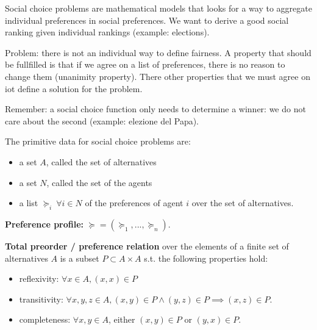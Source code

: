 
%



\bigskip
\noindent Social choice problems are mathematical models that looks for a way to aggregate 
individual preferences in social preferences. We want to derive a good social 
ranking given individual rankings (example: elections).

\noindent Problem: there is not an individual way to define fairness. A property 
that should be fullfilled is that if we agree on a list of preferences, there 
is no reason to change them (unanimity property). There other properties that 
we must agree on iot define a solution for the problem.

\noindent Remember: a social choice function only needs to determine a winner: 
we do not care about the second (example: elezione del Papa).

\bigskip
\noindent The primitive data for social choice problems are:
\begin{itemize}
	\item a set $A$, called the set of alternatives
	\item a set $N$, called the set of the agents
	\item a list $\succeq_i ~\forall i \in N$ of the preferences of agent $i$ over the set of alternatives.
\end{itemize}

\noindent \textbf{Preference profile:} $\succeq = (\succeq_1,...,\succeq_n)$.

\bigskip
\noindent \textbf{Total preorder / preference relation} over the elements of a finite set of alternatives $A$ is a subset $P \subset A \times A$ s.t. the following properties hold:
\begin{itemize}
	\item reflexivity: $\forall x \in A, (x,x) \in P$
	\item transitivity: $\forall x, y, z \in A, (x,y) \in P \wedge (y,z) \in P \implies (x,z) \in P$.
	\item completeness: $\forall x,y \in A$, either $(x,y) \in P$ or $(y,x) \in P$.
\end{itemize}

